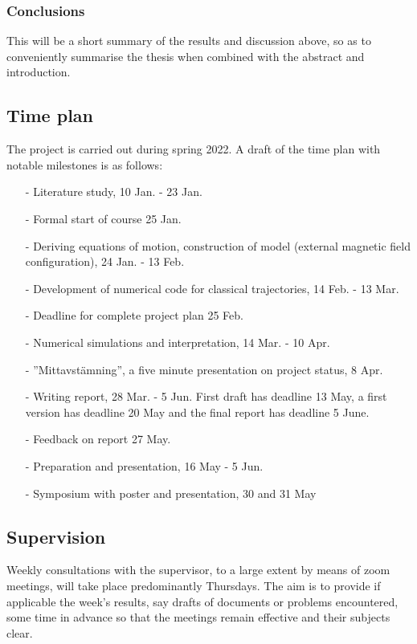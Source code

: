 \documentclass [a4paper]{article}
\begin{document}
\subsubsection*{Conclusions}
This will be a short summary of the results and discussion above, so as to conveniently
summarise the thesis when combined with the abstract and introduction.
\subsection*{Time plan} 
The project is carried out during spring 2022. A draft of the time plan with notable
milestones is as follows: 

\begin{itemize} 

\item[-] Literature study, 10 Jan. - 23 Jan.

\item[-] Formal start of course 25 Jan.

\item[-] Deriving equations of motion, construction of model (external magnetic field 
configuration), 24 Jan. - 13 Feb.

\item[-] Development of numerical code for classical trajectories, 14 Feb. - 13
        Mar.

\item[-] Deadline for complete project plan 25 Feb.

\item[-] Numerical simulations and interpretation, 14 Mar. - 10 Apr.

\item[-] ''Mittavstämning'', a five minute presentation on project status, 8 Apr.

\item[-] Writing report, 28 Mar. - 5 Jun. First draft has deadline 13 May, a first version
        has deadline 20 May and the final report
        has deadline 5 June.

\item[-] Feedback on report 27 May.

\item[-] Preparation and presentation, 16 May - 5 Jun.

\item[-] Symposium with poster and presentation, 30 and 31 May

\end{itemize}

\subsection*{Supervision}
Weekly consultations with the supervisor, to a large extent by means of zoom meetings, will take place
predominantly Thursdays. The aim is to provide if applicable the week's results, say drafts
of documents or problems encountered, some time in advance so that the meetings remain
effective and their subjects clear.
\end{document}
